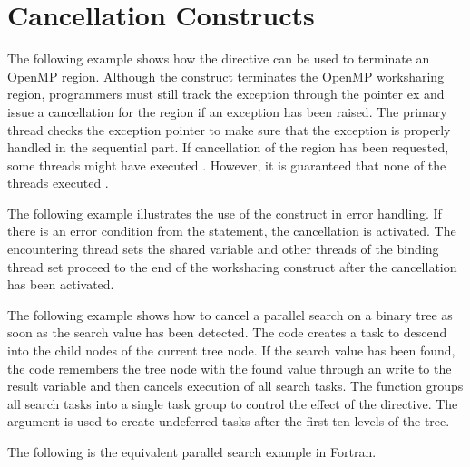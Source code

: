 \pagebreak
\section{Cancellation Constructs}
\label{sec:cancellation}

The following example shows how the  directive can be used to terminate 
an OpenMP region. Although the  construct terminates the OpenMP 
worksharing region, programmers must still track the exception through the pointer 
ex and issue a cancellation for the  region if an exception has 
been raised. The primary thread checks the exception pointer to make sure that the 
exception is properly handled in the sequential part. If cancellation of the  
region has been requested, some threads might have executed . 
However, it is guaranteed that none of the threads executed .



The following example illustrates the use of the  construct in error 
handling. If there is an error condition from the  statement, 
the cancellation is activated. The encountering thread sets the shared variable 
 and other threads of the binding thread set proceed to the end of 
the worksharing construct after the cancellation has been activated. 


\clearpage

The following example shows how to cancel a parallel search on a binary tree as 
soon as the search value has been detected. The code creates a task to descend 
into the child nodes of the current tree node. If the search value has been found, 
the code remembers the tree node with the found value through an  
write to the result variable and then cancels execution of all search tasks. The 
function  groups all search tasks into a single 
task group to control the effect of the  directive. The 
 argument is used to create undeferred tasks after the first ten 
levels of the tree.



The following is the equivalent parallel search example in Fortran.




